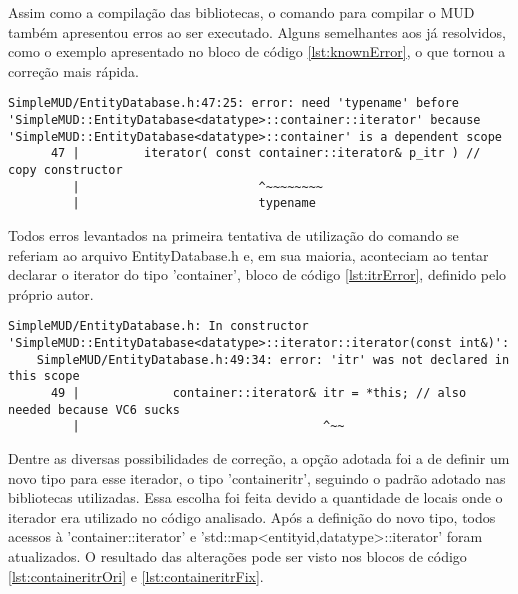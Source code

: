 Assim como a compilação das bibliotecas, o comando para compilar o MUD também apresentou 
erros ao ser executado. Alguns semelhantes aos já resolvidos, como o exemplo apresentado 
no bloco de código \ref{lst:knownError}, o que tornou a correção mais rápida.

\begin{lstlisting}[breaklines, label={lst:knownError}, caption={Exemplo de erro conhecido}]
    SimpleMUD/EntityDatabase.h:47:25: error: need 'typename' before 'SimpleMUD::EntityDatabase<datatype>::container::iterator' because 'SimpleMUD::EntityDatabase<datatype>::container' is a dependent scope
      47 |         iterator( const container::iterator& p_itr ) // copy constructor
         |                         ^~~~~~~~~
         |                         typename 
\end{lstlisting}

Todos erros levantados na primeira tentativa de utilização do comando se referiam ao arquivo
EntityDatabase.h e, em sua maioria, aconteciam ao tentar declarar o iterator do tipo 'container',
bloco de código \ref{lst:itrError}, definido pelo próprio autor.

\begin{lstlisting}[breaklines, label={lst:itrError}, caption={Exemplo de erro ao declarar iterador do tipo 'container'}]
    SimpleMUD/EntityDatabase.h: In constructor 'SimpleMUD::EntityDatabase<datatype>::iterator::iterator(const int&)':
    SimpleMUD/EntityDatabase.h:49:34: error: 'itr' was not declared in this scope
      49 |             container::iterator& itr = *this; // also needed because VC6 sucks
         |                                  ^~~
\end{lstlisting}

Dentre as diversas possibilidades de correção, a opção adotada foi a de definir um novo tipo para
esse iterador, o tipo 'containeritr', seguindo o padrão adotado nas bibliotecas utilizadas.
Essa escolha foi feita devido a quantidade de locais onde o iterador era utilizado no código analisado.
Após a definição do novo tipo, todos acessos à 'container::iterator' e  
'std::map<entityid,datatype>::iterator' foram atualizados. O resultado das alterações pode ser visto nos
blocos de código \ref{lst:containeritrOri} e \ref{lst:containeritrFix}.

